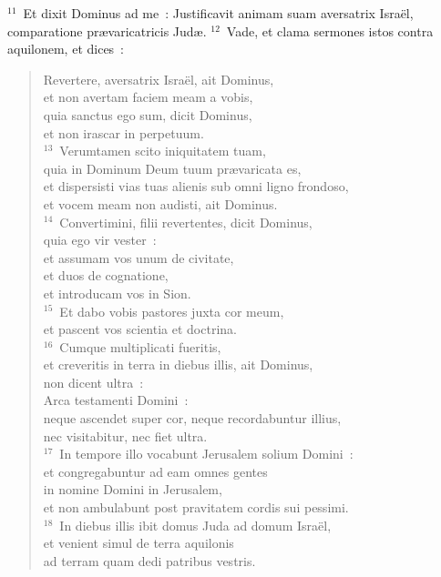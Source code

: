 ${}^{11}$~Et dixit Dominus ad me~: Justificavit animam suam aversatrix Isra\"el, comparatione pr\ae varicatricis Jud\ae .
${}^{12}$~Vade, et clama sermones istos contra aquilonem, et dices~: \begin{flushleft}\begin{verse}Revertere, aversatrix Isra\"el, ait Dominus,\\ et non avertam faciem meam a vobis,\\ quia sanctus ego sum, dicit Dominus,\\ et non irascar in perpetuum.\\
${}^{13}$~Verumtamen scito iniquitatem tuam,\\ quia in Dominum Deum tuum pr\ae varicata es,\\ et dispersisti vias tuas alienis sub omni ligno frondoso,\\ et vocem meam non audisti, ait Dominus.\\
${}^{14}$~Convertimini, filii revertentes, dicit Dominus,\\ quia ego vir vester~:\\ et assumam vos unum de civitate,\\ et duos de cognatione,\\ et introducam vos in Sion.\\
${}^{15}$~Et dabo vobis pastores juxta cor meum,\\ et pascent vos scientia et doctrina.\\
${}^{16}$~Cumque multiplicati fueritis,\\ et creveritis in terra in diebus illis, ait Dominus,\\ non dicent ultra~:\\ Arca testamenti Domini~:\\ neque ascendet super cor, neque recordabuntur illius,\\ nec visitabitur, nec fiet ultra.\\
${}^{17}$~In tempore illo vocabunt Jerusalem solium Domini~:\\ et congregabuntur ad eam omnes gentes\\ in nomine Domini in Jerusalem,\\ et non ambulabunt post pravitatem cordis sui pessimi.\\
${}^{18}$~In diebus illis ibit domus Juda ad domum Isra\"el,\\ et venient simul de terra aquilonis\\ ad terram quam dedi patribus vestris.\\

\end{verse}
\end{flushleft}

